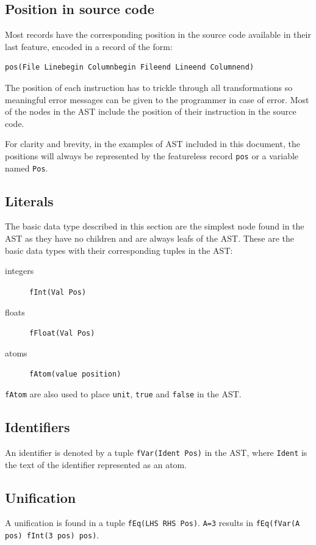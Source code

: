 \documentclass[a4paper]{memoir}
\begin{document}
\subsection{Position in source code}
Most records have the corresponding position in the source code available in
their last feature, encoded in a record of the form:
\begin{lstlisting}
pos(File Linebegin Columnbegin Fileend Lineend Columnend)
\end{lstlisting}
The position of each instruction has to trickle through all transformations so meaningful error messages can be given to the programmer in case of error.
Most of the nodes in the AST include the position of their instruction in the
source code.

For clarity and brevity, in the examples of AST included in this document, the
positions will always be represented by the featureless record \lstinline!pos!
or a variable named \lstinline!Pos!. 
\subsection{Literals}
The basic data type described in this section are the simplest node found in the AST as they have no children and are always leafs of the AST.
These are the basic data types with their corresponding tuples in the AST:
\begin{description}
  \item[integers] \lstinline!fInt(Val Pos)!
  \item[floats] \lstinline!fFloat(Val Pos)!
  \item[atoms] \lstinline!fAtom(value position)!
\end{description}

\lstinline!fAtom! are also used to place \lstinline!unit!, \lstinline!true! and
\lstinline!false! in the AST.

\subsection{Identifiers}\label{sec:input:identifiers}
An identifier is denoted by a tuple \lstinline!fVar(Ident Pos)! in the AST,
where \lstinline!Ident! is the text of the identifier represented as an atom.

\subsection{Unification}
A unification is found in a tuple \lstinline!fEq(LHS RHS Pos)!.
\lstinline!A=3! results in 
\lstinline!fEq(fVar(A pos) fInt(3 pos) pos)!.
\end{document}
